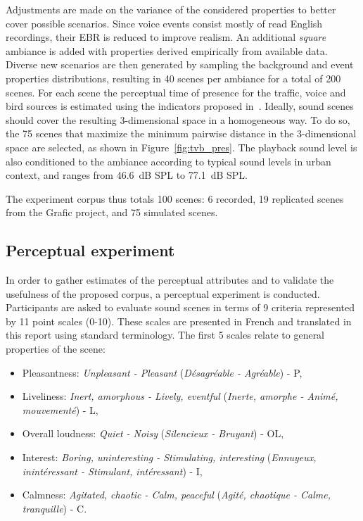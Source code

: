 \documentclass[twocolumn]{article}
\begin{document}
Adjustments are made on the variance of the considered properties to better cover possible scenarios. Since voice events consist mostly of read English recordings, their EBR is reduced to improve realism. An additional \textit{square} ambiance is added with properties derived empirically from available data. Diverse new scenarios are then generated by sampling the background and event properties distributions, resulting in 40 scenes per ambiance for a total of 200 scenes. For each scene the perceptual time of presence for the traffic, voice and bird sources is estimated using the indicators proposed in~\cite{gontier2018}. Ideally, sound scenes should cover the resulting 3-dimensional space in a homogeneous way. To do so, the 75 scenes that maximize the minimum pairwise distance in the 3-dimensional space are selected, as shown in Figure~\ref{fig:tvb_pres}. The playback sound level is also conditioned to the ambiance according to typical sound levels in urban context, and ranges from 46.6~dB SPL to 77.1~dB SPL.

The experiment corpus thus totals 100 scenes: 6 recorded, 19 replicated scenes from the Grafic project, and 75 simulated scenes.


\subsection{Perceptual experiment}
\label{sec:data_exp}

In order to gather estimates of the perceptual attributes and to validate the usefulness of the proposed corpus, a perceptual experiment is conducted. Participants are asked to evaluate sound scenes in terms of 9 criteria represented by 11 point scales (0-10). These scales are presented in French and translated in this report using standard terminology. The first 5 scales relate to general properties of the scene:
\begin{itemize}
\item Pleasantness: \textit{Unpleasant - Pleasant} (\textit{D\'esagr\'eable - Agr\'eable}) - P,
\item Liveliness: \textit{Inert, amorphous - Lively, eventful} (\textit{Inerte, amorphe - Anim\'e, mouvement\'e}) - L,
\item Overall loudness: \textit{Quiet - Noisy} (\textit{Silencieux - Bruyant}) - OL,
\item Interest: \textit{Boring, uninteresting - Stimulating, interesting} (\textit{Ennuyeux, inint\'eressant - Stimulant, int\'eressant}) - I,
\item Calmness: \textit{Agitated, chaotic - Calm, peaceful} (\textit{Agit\'e, chaotique - Calme, tranquille}) - C.
\end{itemize}
\end{document}
